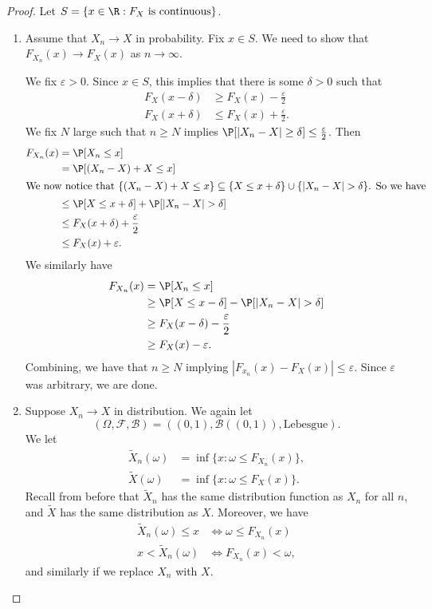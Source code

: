 \documentclass[a4paper]{article}
\begin{document}
\begin{proof}
  Let $S = \{x \in \R: F_X\text{ is continuous}\}$.
  \begin{enumerate}
    \item Assume that $X_n \to X$ in probability. Fix $x \in S$. We need to show that $F_{X_n}(x) \to F_X(x)$ as $n \to \infty$.

      We fix $\varepsilon > 0$. Since $x \in S$, this implies that there is some $\delta > 0$ such that
      \begin{align*}
        F_X(x - \delta) &\geq F_X(x) - \frac{\varepsilon}{2}\\
        F_X(x + \delta) & \leq F_X(x) + \frac{\varepsilon}{2}.
      \end{align*}
      We fix $N$ large such that $n \geq N$ implies $\P[|X_n - X| \geq \delta] \leq \frac{\varepsilon}{2}$. Then
      \begin{align*}
        F_{X_n}(x) &= \P[X_n \leq x] \\
        &= \P[(X_n - X) + X \leq x] \\
        \intertext{We now notice that $\{(X_n - X) + X \leq x\} \subseteq \{X \leq x + \delta\} \cup \{|X_n - X| > \delta\}$. So we have}
        &\leq \P[X \leq x + \delta] + \P[|X_n - X| > \delta]\\
        &\leq F_X(x + \delta) + \frac{\varepsilon}{2}\\
        &\leq F_X(x) + \varepsilon.
       \end{align*}
       We similarly have
       \begin{align*}
         F_{X_n}(x) &= \P[X_n \leq x] \\
         &\geq \P[X \leq x - \delta] - \P[|X_n - X| > \delta]\\
         &\geq F_X(x - \delta) - \frac{\varepsilon}{2}\\
         &\geq F_X(x) - \varepsilon.
       \end{align*}
       Combining, we have that $n \geq N$ implying $|F_{x_n}(x) - F_X(x)| \leq \varepsilon$. Since $\varepsilon$ was arbitrary, we are done.
     \item Suppose $X_n \to X$ in distribution. We again let
       \[
         (\Omega, \mathcal{F}, \mathcal{B}) = ((0, 1), \mathcal{B}((0, 1)), \text{Lebesgue}).
       \]
       We let
       \begin{align*}
         \tilde{X}_n(\omega) &= \inf\{x : \omega \leq F_{X_n}(x)\},\\
         \tilde{X}(\omega) &= \inf \{x : \omega \leq F_X(x)\}.
       \end{align*}
       Recall from before that $\tilde{X}_n$ has the same distribution function as $X_n$ for all $n$, and $\tilde{X}$ has the same distribution as $X$. Moreover, we have
       \begin{align*}
         \tilde{X}_n(\omega) \leq x &\Leftrightarrow \omega \leq F_{X_n}(x)\\
         x < \tilde{X}_n(\omega) &\Leftrightarrow F_{X_n}(x) < \omega,
       \end{align*}
       and similarly if we replace $X_n$ with $X$.


\end{enumerate}
\end{proof}
\end{document}
